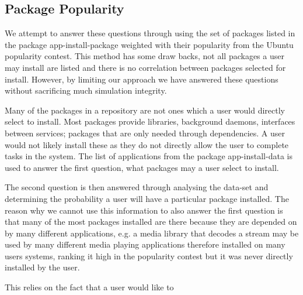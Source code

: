 

\subsection{Package Popularity}
{}We attempt to answer these questions through using the set of packages listed in the package app-install-package
{}weighted with their popularity from the Ubuntu popularity contest.
{}This method has some draw backs, not all packages a user may install are listed and there is no correlation between packages selected for install.
{}However, by limiting our approach we have answered these questions without sacrificing much simulation integrity.

Many of the packages in a repository are not ones which a user would directly select to install.
Most packages provide libraries, background daemons, interfaces between services; packages that are only needed through dependencies.
A user would not likely install these as they do not directly allow the user to complete tasks in the system.
The list of applications from the package app-install-data is used to answer the first question, what packages may a user select to install.

The second question is then answered through analysing the data-set and determining the probability a user will have a particular package installed.
The reason why we cannot use this information to also answer the first question is that many of the most packages installed are there because they are depended on by many different applications,
e.g. a media library that decodes a stream may be used by many different media playing applications therefore installed on many users systems, 
ranking it high in the popularity contest but it was never directly installed by the user.


This relies on the fact that a user would like to 

